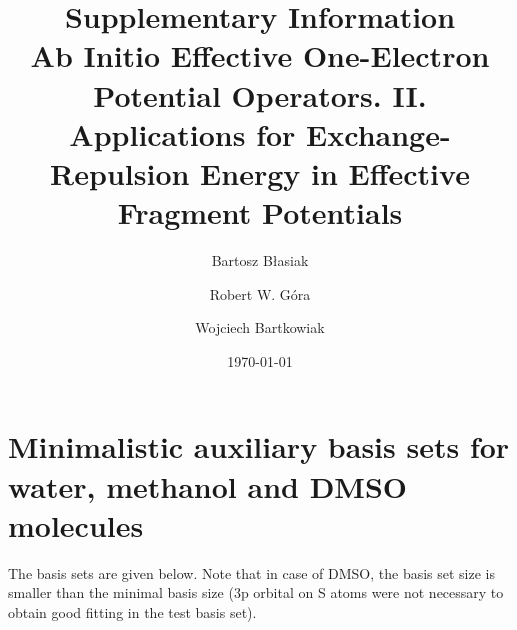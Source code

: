 


\renewcommand{\thefigure}{S\arabic{figure}}
\setcounter{figure}{0}

\title{Supplementary Information\\Ab Initio Effective One-Electron Potential Operators. II.
Applications for Exchange-Repulsion Energy in Effective Fragment Potentials}

\author{Bartosz B{\l}asiak}

\author{Robert W. G{\'o}ra}
\author{Wojciech Bartkowiak}


\date{\today}



\pacs{}

\maketitle

\tableofcontents

\section{Minimalistic auxiliary basis sets for water, methanol and DMSO molecules}

The basis sets are given below. Note that in case of DMSO, the basis set size is smaller than the
minimal basis size (3p orbital on S atoms were not necessary to obtain good fitting in the test basis set).

